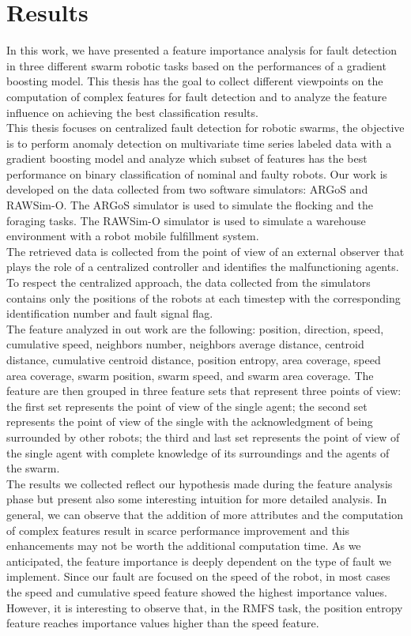 \documentclass[../../Thesis.tex]{subfiles}
\begin{document}
	
	\section{Results}
		In this work, we have presented a feature importance analysis for fault detection in three different swarm robotic tasks based on the performances of a gradient boosting model. This thesis has the goal to collect different viewpoints on the computation of complex features for fault detection and to analyze the feature influence on achieving the best classification results.\\
		This thesis focuses on centralized fault detection for robotic swarms, the objective is to perform anomaly detection on multivariate time series labeled data with a gradient boosting model and analyze which subset of features has the best performance on binary classification of nominal and faulty robots. Our work is developed on the data collected from two software simulators: ARGoS and RAWSim-O. The ARGoS simulator is used to simulate the flocking and the foraging tasks. The RAWSim-O simulator is used to simulate a warehouse environment with a robot mobile fulfillment system. \\
		The retrieved data is collected from the point of view of an external observer that plays the role of a centralized controller and identifies the malfunctioning agents. To respect the centralized approach, the data collected from the simulators contains only the positions of the robots at each timestep with the corresponding identification number and fault signal flag.\\
		The feature analyzed in out work are the following: position, direction, speed, cumulative speed, neighbors number, neighbors average distance, centroid distance, cumulative centroid distance, position entropy, area coverage, speed area coverage, swarm position, swarm speed, and swarm area coverage. The feature are then grouped in three feature sets that represent three points of view: the first set represents the point of view of the single agent; the second set represents the point of view of the single with the acknowledgment of being surrounded by other robots; the third and last set represents the point of view of the single agent with complete knowledge of its surroundings and the agents of the swarm.\\
		The results we collected reflect our hypothesis made during the feature analysis phase but present also some interesting intuition for more detailed analysis. In general, we can observe that the addition of more attributes and the computation of complex features result in scarce performance improvement and this enhancements may not be worth the additional computation time. As we anticipated, the feature importance is deeply dependent on the type of fault we implement. Since our fault are focused on the speed of the robot, in most cases the speed and cumulative speed feature showed the highest importance values. However, it is interesting to observe that, in the RMFS task, the position entropy feature reaches importance values higher than the speed feature.\\
\end{document}
